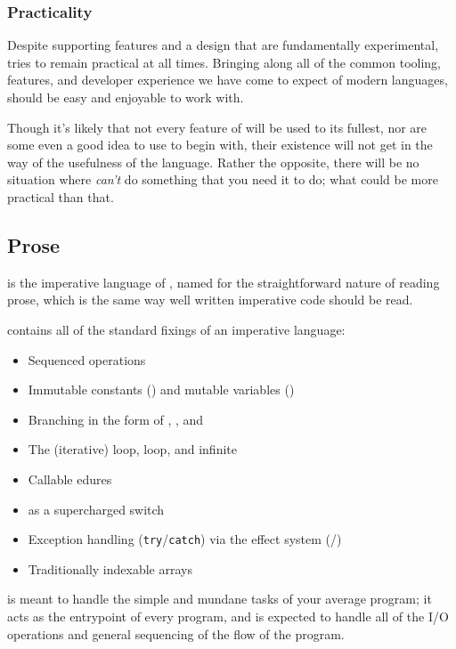 \subsubsection{Practicality}

Despite supporting features and a design that are fundamentally experimental,
\Trilogy{} tries to remain practical at all times. Bringing along all of the
common tooling, features, and developer experience we have come to expect of
modern languages, \Trilogy{} should be easy and enjoyable to work with.

Though it's likely that not every feature of \Trilogy{} will be used to its
fullest, nor are some even a good idea to use to begin with, their existence
will not get in the way of the usefulness of the language. Rather the opposite,
there will be no situation where \Trilogy{} \emph{can't} do something that you
need it to do; what could be more practical than that.

\subsection{Prose}

\Prose{} is the imperative language of \Trilogy{}, named for the
straightforward nature of reading prose, which is the same way
well written imperative code should be read.

\Prose{} contains all of the standard fixings of an imperative language:
\begin{itemize}
    \item Sequenced operations
    \item Immutable constants () and mutable variables ()
    \item Branching in the form of , , and 
    \item The (iterative)  loop,  loop, and infinite 
    \item Callable edures
    \item {} as a supercharged switch
    \item Exception handling (\texttt{try}/\texttt{catch}) via the effect system (/)
    \item Traditionally indexable arrays
\end{itemize}

\Prose{} is meant to handle the simple and mundane tasks of your
average program; it acts as the entrypoint of every program,
and is expected to handle all of the I/O operations and general
sequencing of the flow of the program.

